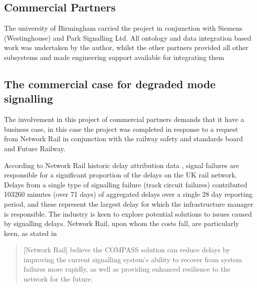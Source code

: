 \subsection{Commercial Partners}
The university of Birmingham carried the project in conjunction with Siemens (Westinghouse) and Park Signalling Ltd. All ontology and data integration based work was undertaken by the author, whilst the other partners provided all other subsystems and made engineering support available for integrating them  

\subsection{The commercial case for degraded mode signalling}
The involvement in this project of commercial partners demands that it have a business case, in this case the project was completed in response to a request from Network Rail in conjunction with the railway safety and standards board and Future Railway. 

According to Network Rail historic delay attribution data  \citep{NetworkRailInfrastructureLtd2017}, signal failures are responsible for a significant proportion of the delays on the UK rail network. Delays from a single type of signalling failure (track circuit failures) contributed 103260 minutes (over 71 days) of aggregated delays over a single 28 day reporting period, and these represent the largest delay for which the infrastructure manager is responsible. The industry is keen to explore potential solutions to issues caused by signalling delays. Network Rail, upon whom the costs fall, are particularly keen, as stated in \citet{MagazineRailTechnology2015} 
\begin{quote}
    [Network Rail] believe the COMPASS solution can reduce delays by improving the current signalling system’s ability to recover from system failures more rapidly, as well as providing enhanced resilience to the network for the future. 
\end{quote}

